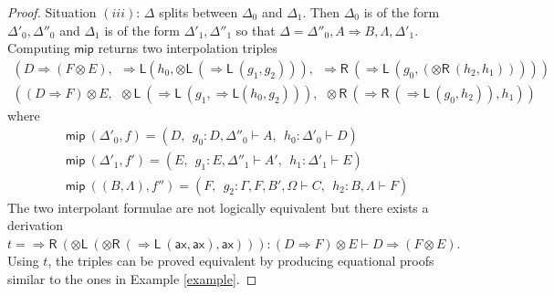 \documentclass[a4paper,UKenglish,cleveref,autoref,thm-restate, anonymous]{lipics-v2021}
\newcommand{\ot}{\otimes}
\newcommand{\Rarr}{\Rightarrow}
\newcommand{\mf}[1]{\mathsf{#1}}
\newcommand{\GG}{\Gamma}
\newcommand{\GD}{\Delta}
\newcommand{\GL}{\Lambda}
\newcommand{\GO}{\Omega}
\newcommand{\vd}{\vdash}
\newcommand{\ax}{\mathsf{ax}}
\newcommand{\tl}{{\otimes}\mathsf{L}}
\newcommand{\tr}{{\otimes}\mathsf{R}}
\newcommand{\Rl}{{\Rarr}\mathsf{L}}
\newcommand{\Rr}{{\Rarr}\mathsf{R}}
\newcommand{\cut}{\mf{cut}}
\begin{document}
\begin{proof}
Situation $(iii)$: $\GD$ splits between $\GD_0$ and $\GD_1$. Then $\GD_0$ is of the form $\GD'_0 , \GD''_0$ and $\GD_1$ is of the form $\GD'_1 , \GD''_1$ so that $\GD = \GD''_0 , A \Rarr B , \GL , \GD'_1$.
Computing $\mf{mip}$ returns two interpolation triples
    \[
      \begin{array}{l}
          (D \Rarr (F \ot E),
          \ \
          \Rl (h_0 , \tl \ (\Rl \ (g_1 , g_2))),
          \ \
          \Rr \ (\Rl \ (g_0 , (\tr \ (h_2 , h_1)))))
        \\[3pt]
          ((D \Rarr F) \ot E,
          \ \
          \tl \ (\Rl \ (g_1 , \Rl (h_0 , g_2))),
          \ \
          \tr \ (\Rr \ (\Rl \ (g_0 , h_2)), h_1))
      \end{array}
    \]
    where
    \[
      \begin{array}{l}
      \mf{mip} \ (\GD'_0,f) = (D , \ \ g_0 : D , \GD''_0 \vd A , \ \ h_0 : \GD'_0 \vd D)
      \\[3pt]
      \mf{mip} \ (\GD'_1, f') = (E , \ \ g_1 : E , \GD''_1 \vd A' , \ \ h_1 : \GD'_1 \vd E)
      \\[3pt]
      \mf{mip} \ ((B, \GL),f'') = (F , \ \ g_2 : \GG , F , B' , \GO \vd C ,\ \  h_2 : B , \GL \vd F)
      \end{array}
    \]
    The two interpolant formulae are not logically equivalent but there exists a derivation $t = \Rr \ (\tl \ (\tr \ (\Rl \ (\ax , \ax),\ax))) : (D \Rarr F) \ot E \vd D \Rarr (F \ot E)$.
    Using $t$, the triples can be proved equivalent by producing equational proofs similar to the ones in Example \ref{example}.

\end{proof}
\end{document}
